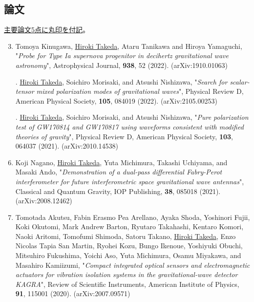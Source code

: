 \documentclass[uplatex, 11pt]{jsarticle}
\newcommand{\ctext}[1]{\ooalign{
\hfil\resizebox{\width}{\height}{#1}\hfil
\crcr
\raise-.1mm\hbox{\Large$\bigcirc$}}}
\begin{document}
\subsection*{論文}
\uline{主要論文5点に丸印を付記}。
\begin{enumerate}
\setcounter{enumi}{2}
\item Tomoya Kinugawa, \uline{Hiroki Takeda}, Ataru Tanikawa and Hiroya Yamaguchi, "\emph{Probe for Type Ia supernova progenitor in decihertz gravitational wave astronomy}", Astrophysical Journal, {\bf 938}, 52 (2022). (arXiv:1910.01063)\\

   \item[\ctext{4}.] \uline{Hiroki Takeda}, Soichiro Morisaki, and Atsushi Nishizawa,
"\emph{Search for scalar-tensor mixed polarization modes of gravitational waves}",
Physical Review D, American Physical Society, {\bf 105}, 084019 (2022).
(arXiv:2105.00253)\\

   \item[\ctext{5}.] \uline{Hiroki Takeda}, Soichiro Morisaki, and Atsushi Nishizawa, "\emph{Pure polarization test of GW170814 and GW170817 using waveforms consistent with modified theories of gravity}", Physical Review D, American Physical Society, {\bf 103}, 064037 (2021). (arXiv:2010.14538)\\
   
 \setcounter{enumi}{5}
   \item Koji Nagano, \uline{Hiroki Takeda}, Yuta Michimura, Takashi Uchiyama, and Masaki Ando, "\emph{Demonstration of a dual-pass differential Fabry-Perot interferometer for future interferometric space gravitational wave antennas}", Classical and Quantum Gravity, IOP Publishing, {\bf 38}, 085018 (2021). (arXiv:2008.12462)\\
  
\item Tomotada Akutsu, Fabin Erasmo Pea Arellano, Ayaka Shoda, Yoshinori Fujii, Koki Okutomi, Mark Andrew Barton, Ryutaro Takahashi, Kentaro Komori, Naoki Aritomi, Tomofumi Shimoda, Satoru Takano, \uline{Hiroki Takeda}, Enzo Nicolas Tapia San Martin, Ryohei Kozu, Bungo Ikenoue, Yoshiyuki Obuchi, Mitsuhiro Fukushima, Yoichi Aso, Yuta Michimura, Osamu Miyakawa, and Masahiro Kamiizumi, "\emph{Compact integrated optical sensors and electromagnetic actuators for vibration isolation systems in the gravitational-wave detector KAGRA}", Review of Scientific Instruments, American Institute of Physics, {\bf 91}, 115001 (2020). (arXiv:2007.09571)\\


\end{enumerate}
\end{document}
